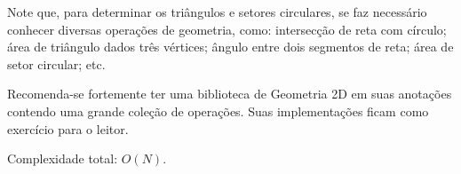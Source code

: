 Note que, para determinar os triângulos e setores circulares, se faz necessário
conhecer diversas operações de geometria, como:
intersecção de reta com círculo;
área de triângulo dados três vértices;
ângulo entre dois segmentos de reta;
área de setor circular;
etc.

Recomenda-se fortemente ter uma biblioteca de Geometria 2D em suas anotações
contendo uma grande coleção de operações. Suas implementações ficam como exercício para o
leitor.

Complexidade total: $O(N)$.

